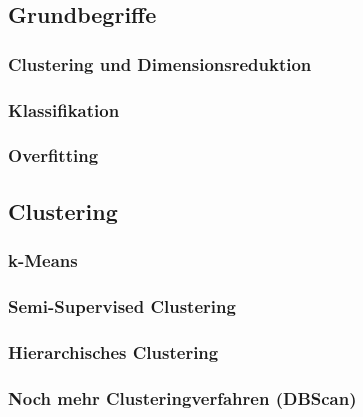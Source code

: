         \subsection{Grundbegriffe} %

            \subsubsection{Clustering und Dimensionsreduktion} %

            \subsubsection{Klassifikation} %

            \subsubsection{Overfitting} %

        \subsection{Clustering} %

            \subsubsection{k-Means} %

            \subsubsection{Semi-Supervised Clustering} %

            \subsubsection{Hierarchisches Clustering} %

            \subsubsection{Noch mehr Clusteringverfahren (DBScan)} %


